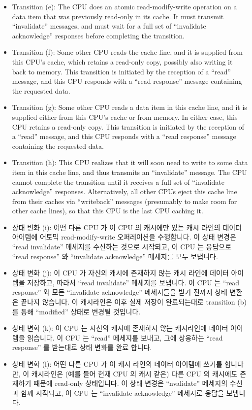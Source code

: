 \begin{itemize}
\item	Transition (e):
	The CPU does an atomic read-modify-write operation on a data item
	that was previously read-only in its cache.
	It must transmit ``invalidate'' messages, and must wait for a
	full set of ``invalidate acknowledge'' responses before completing
	the transition.
\item	Transition (f):
	Some other CPU reads the cache line, and it is supplied from
	this CPU's cache, which retains a read-only copy, possibly also
	writing it back to memory.
	This transition is initiated by the reception of a ``read''
	message, and this CPU responds with a ``read response'' message
	containing the requested data.
\item	Transition (g):
	Some other CPU reads a data item in this cache line,
	and it is supplied either from this CPU's cache or from memory.
	In either case, this CPU retains a read-only copy.
	This transition is initiated by the reception of a ``read''
	message, and this CPU responds with a ``read response'' message
	containing the requested data.
\item	Transition (h):
	This CPU realizes that it will soon need to write to some data
	item in this cache line, and thus transmits an ``invalidate'' message.
	The CPU cannot complete the transition until it receives a full
	set of ``invalidate acknowledge'' responses.
	Alternatively, all other CPUs eject this cache line from
	their caches via ``writeback'' messages (presumably to make room
	for other cache lines),
	so that this CPU is the last CPU caching it.
\fi
\item	상태 변화 (i):
	어떤 다른 CPU 가 이 CPU 의 캐시에만 있는 캐시 라인의 데이터 아이템에
	어토믹 read-modify-write 오퍼레이션을 수행합니다.
	이 상태 변경은 ``read invalidate'' 메세지를 수신하는 것으로 시작되고,
	이 CPU 는 응답으로 ``read response'' 와 ``invalidate acknowledge''
	메세지를 모두 보냅니다.
\item	상태 변화 (j):
	이 CPU 가 자신의 캐시에 존재하지 않는 캐시 라인에 데이터 아이템을
	저장하고, 따라서 ``read invalidate'' 메세지를 보냅니다.
	이 CPU 는 ``read response'' 와 모든 ``invalidate acknowledge''
	메세지들을 받기 전까지 상태 변환은 끝나지 않습니다.
	이 캐시라인은 이후 실제 저장이 완료되는대로 transition (b) 를 통해
	``modified'' 상태로 변경될 것입니다.
\item	상태 변화 (k):
	이 CPU 는 자신의 캐시에 존재하지 않는 캐시라인에 데이터 아이템을
	읽습니다.
	이 CPU 는 ``read'' 메세지를 보내고, 그에 상응하는 ``read response'' 를
	받는대로 상태 변화를 완료 합니다.
\item	상태 변화 (l):
	어떤 다른 CPU 가 이 캐시 라인의 데이터 아이템에 쓰기를 합니다만, 이
	캐시라인은 (예를 들어 현재 CPU 의 캐시 같은) 다른 CPU 의 캐시에도
	존재하기 때문에 read-only 상태입니다.
	이 상태 변경은 ``nvalidate'' 메세지의 수신과 함께 시작되고, 이 CPU 는
	``invalidate acknowledge'' 메세지로 응답을 보냅니다.
\iffalse


\end{itemize}
